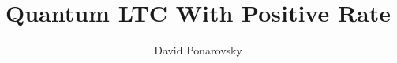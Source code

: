 \documentclass{article}
\begin{document}
\title{Quantum LTC With Positive Rate}
\author{David Ponarovsky}
\maketitle
\newcommand{ \Hw }{ \delta\Delta -\Delta^{\frac{1}{2}-\varepsilon}/\delta  }
	\newcommand{ \Nw }{ \Delta^{\frac{3}{2}-\varepsilon}} 
	  \newcommand{ \Gu } { \Gamma^{\cup} }
	  \newcommand{ \Guq } { \Gamma^{\cup, \square} }

    	\newcommand{ \Gsa } {\Gamma_{\square_{1}} }
	\newcommand{ \Gsb } {\Gamma_{\square_{2}} }
        \newcommand{ \Aa } { C_{A_{1}}}  
	\newcommand{ \Ab } { C_{A_{2}}}
	\newcommand{ \Ac } { C_{A_{3}}}
	\newcommand{ \Aab } { \Aa \otimes \Ab } 
	\newcommand{ \Aac } { \Aa \otimes \Ac }
	\newcommand{ \Aabc } { \Aa \otimes \Ab \otimes \Ac }
	\newcommand{ \Aabp } { \Aa^{\perp} \otimes \Ab^{\perp} } 
	\newcommand{ \Aacp } { \Aa^{\perp} \otimes \Ac^{\perp} }
	\newcommand{ \Aabcp } { \Aa^{\perp} \otimes \Ab^{\perp} \otimes \Ac^{\perp} }
	\newcommand{ \Aabpp } { \left( \Aabp \right)^\perp } 
	\newcommand{ \Aacpp } { \left( \Aacp \right)^\perp }
	\newcommand{ \Aabcpp } { \left( \Aabcp \right)^\perp }
	\newcommand{ \YY } {  y_{1}y_{2}^{\top} }
	\newcommand{ \ZZ } {  z_{1}z_{2}^{\top} } 
	\newcommand{ \TT } { \tilde{\tau} } 
\end{document}
